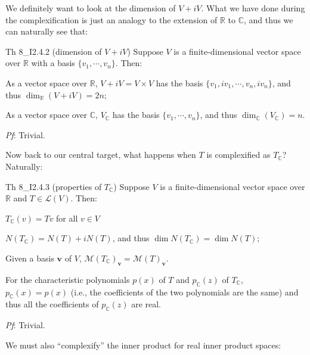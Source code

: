 \documentclass{article}
\begin{document}
We definitely want to look at the dimension of $V+iV$. What we have done during the complexification is just an analogy to the extension of $\mathbb{R}$ to $\mathbb{C}$, and thus we can naturally see that:

\begin{Th}{Th 8\_I2.4.2 (dimension of $V+iV$)}
    Suppose $V$ is a finite-dimensional vector space over $\mathbb{R}$ with a basis $\{v_1, \cdots, v_n\}$. Then:
    \begin{compactenum}
        \item As a vector space over $\mathbb{R}$, $V+iV = V\times V$ has the basis $\{v_1, iv_1, \cdots, v_n, iv_n\}$, and thus $\dim_{\mathbb{R}}(V+iV) = 2n$;
        \item As a vector space over $\mathbb{C}$, $V_{\mathbb{C}}$ has the basis $\{v_1, \cdots, v_n\}$, and thus $\dim_{\mathbb{C}}(V_{\mathbb{C}}) = n$.
    \end{compactenum}
    \tcblower
    \textit{Pf}: Trivial.
\end{Th}

Now back to our central target, what happens when $T$ is complexified as $T_{\mathbb{C}}$? Naturally:

\begin{Th}{Th 8\_I2.4.3 (properties of $T_{\mathbb{C}}$)}
    Suppose $V$ is a finite-dimensional vector space over $\mathbb{R}$ and $T\in\mathcal{L}(V)$. Then:
    \begin{compactenum}
        \item $T_\mathbb{C}(v) = Tv$ for all $v\in V$
        \item $N(T_{\mathbb{C}}) = N(T) + iN(T)$, and thus $\dim N(T_{\mathbb{C}}) = \dim N(T)$;
        \item Given a basis $\pmb{v}$ of $V$, $\mathcal{M}(T_{\mathbb{C}})_{\pmb{v}} = \mathcal{M}(T)_{\pmb{v}}$.
        \item For the characteristic polynomials $p(x)$ of $T$ and $p_{\mathbb{C}}(z)$ of $T_{\mathbb{C}}$, $p_{\mathbb{C}}(x) = p(x)$ (i.e., the coefficients of the two polynomials are the same) and thus all the coefficients of $p_{\mathbb{C}}(z)$ are real.
    \end{compactenum}
    \tcblower
    \textit{Pf}: Trivial.
\end{Th}

We must also ``complexify'' the inner product for real inner product spaces:
\end{document}
